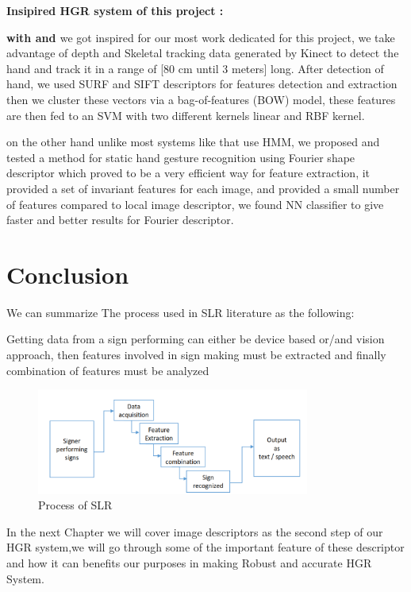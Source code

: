 \textbf{ Insipired HGR system  of this project : }


\textbf{with \cite{dardas} and \cite{47} } we got inspired for our most work dedicated for this project, we take advantage of  depth and Skeletal tracking  data generated by Kinect to detect the hand and track it  in a range of [80 cm until 3 meters] long.
After detection of hand, we used SURF and SIFT descriptors for features detection and extraction then we  cluster these vectors via a bag-of-features (BOW) model, these features are then fed to an SVM with two different kernels linear and RBF kernel.

on the other hand unlike most systems like \cite{33} that use HMM,  we proposed and tested a method for static hand gesture recognition using  Fourier shape  descriptor which proved to be a very efficient way for feature extraction, it provided a set of invariant features for each image,  and provided a small number of features compared to local image descriptor, we found NN classifier to give faster and better results for Fourier descriptor.
\newpage
\section{Conclusion}

We can summarize The process used in SLR literature as the following:

Getting data from a sign performing can either be device based or/and vision approach, then features
involved in sign making must be extracted and finally combination of features must be analyzed 

\begin{figure}[H]
\centering
\includegraphics[width=0.8\textwidth]{img/SLR.PNG}
\caption{  Process of SLR }
\label{fig:SLR}
\end{figure}

In the next Chapter we will cover image descriptors as the second step of our HGR system,we will go through some of the important feature of these descriptor and how it can benefits our purposes in making Robust and accurate HGR System. 